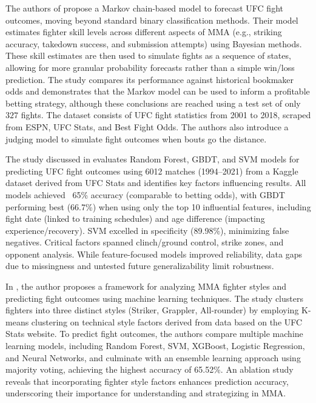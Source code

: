 \documentclass[12pt,twoside]{report}
\begin{document}
The authors of \citep{holmes_2023} propose a Markov chain-based model to forecast UFC fight outcomes, moving beyond standard binary classification methods. Their model estimates fighter skill levels across different aspects of MMA (e.g., striking accuracy, takedown success, and submission attempts) using Bayesian methods. These skill estimates are then used to simulate fights as a sequence of states, allowing for more granular probability forecasts rather than a simple win/loss prediction. The study compares its performance against historical bookmaker odds and demonstrates that the Markov model can be used to inform a profitable betting strategy, although these conclusions are reached using a test set of only $327$ fights. The dataset consists of UFC fight statistics from 2001 to 2018, scraped from ESPN, UFC Stats, and Best Fight Odds. The authors also introduce a judging model to simulate fight outcomes when bouts go the distance.

The study discussed in \citep{yan_2024} evaluates Random Forest, GBDT, and SVM models for predicting UFC fight outcomes using 6012 matches (1994–2021) from a Kaggle dataset derived from UFC Stats and identifies key factors influencing results. All models achieved ~65\% accuracy (comparable to betting odds), with GBDT performing best (66.7\%) when using only the top 10 influential features, including fight date (linked to training schedules) and age difference (impacting experience/recovery). SVM excelled in specificity (89.98\%), minimizing false negatives. Critical factors spanned clinch/ground control, strike zones, and opponent analysis. While feature-focused models improved reliability, data gaps due to missingness and untested future generalizability limit robustness.

In \citep{yin_2024}, the author proposes a framework for analyzing MMA fighter styles and predicting fight outcomes using machine learning techniques. The study clusters fighters into three distinct styles (Striker, Grappler, All-rounder) by employing K-means clustering on technical style factors derived from data based on the UFC Stats website. To predict fight outcomes, the authors compare multiple machine learning models, including Random Forest, SVM, XGBoost, Logistic Regression, and Neural Networks, and culminate with an ensemble learning approach using majority voting, achieving the highest accuracy of 65.52\%. An ablation study reveals that incorporating fighter style factors enhances prediction accuracy, underscoring their importance for understanding and strategizing in MMA.
\end{document}
